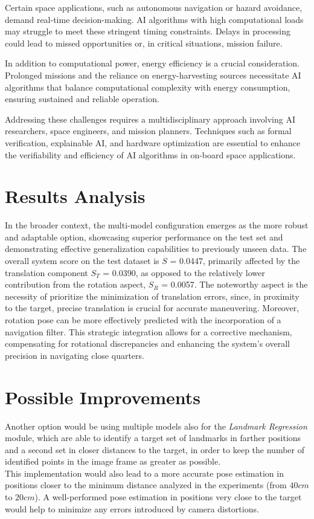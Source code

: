 Certain space applications, such as autonomous navigation or hazard avoidance, demand real-time decision-making. AI algorithms with high computational loads may struggle to meet these stringent timing constraints. Delays in processing could lead to missed opportunities or, in critical situations, mission failure.

In addition to computational power, energy efficiency is a crucial consideration. Prolonged missions and the reliance on energy-harvesting sources necessitate AI algorithms that balance computational complexity with energy consumption, ensuring sustained and reliable operation.

Addressing these challenges requires a multidisciplinary approach involving AI researchers, space engineers, and mission planners. Techniques such as formal verification, explainable AI, and hardware optimization are essential to enhance the verifiability and efficiency of AI algorithms in on-board space applications.

\section{Results Analysis}
In the broader context, the multi-model configuration emerges as the more robust and adaptable option, showcasing superior performance on the test set and demonstrating effective generalization capabilities to previously unseen data. The overall system score on the test dataset is $S$ = 0.0447, primarily affected by the translation component $S_T$ = 0.0390, as opposed to the relatively lower contribution from the rotation aspect, $S_R$ = 0.0057. The noteworthy aspect is the necessity of prioritize the minimization of translation errors, since, in proximity to the target, precise translation is crucial for accurate maneuvering.
Moreover, rotation pose can be more effectively predicted with the incorporation of a navigation filter. This strategic integration allows for a corrective mechanism, compensating for rotational discrepancies and enhancing the system's overall precision in navigating close quarters.

\section{Possible Improvements}
\label{Chapter6/Improv}


Another option would be using multiple models also for the \textit{Landmark Regression} module, which are able to identify a target set of landmarks in farther positions and a second set in closer distances to the target, in order to keep the number of identified points in the image frame as greater as possible.\\
This implementation would also lead to a more accurate pose estimation in positions closer to the minimum distance analyzed in the experiments (from $40 cm$ to $20cm$). A well-performed pose estimation in positions very close to the target would help to minimize any errors introduced by camera distortions.


